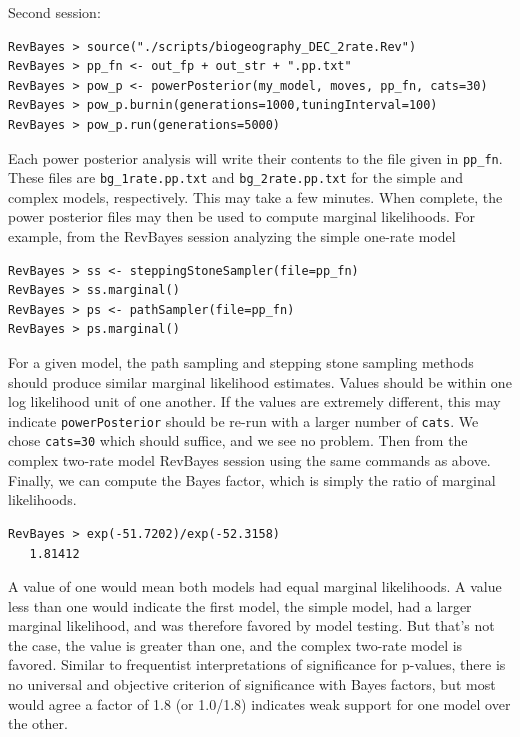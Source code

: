 Second session:
\begin{snugshade}
\begin{lstlisting}
RevBayes > source("./scripts/biogeography_DEC_2rate.Rev")
RevBayes > pp_fn <- out_fp + out_str + ".pp.txt"
RevBayes > pow_p <- powerPosterior(my_model, moves, pp_fn, cats=30) 
RevBayes > pow_p.burnin(generations=1000,tuningInterval=100)
RevBayes > pow_p.run(generations=5000)  
\end{lstlisting}
\end{snugshade}

Each power posterior analysis will write their contents to the file given in {\tt pp\_fn}.
These files are {\tt bg\_1rate.pp.txt} and {\tt bg\_2rate.pp.txt} for the simple and complex models, respectively.
This may take a few minutes.
When complete, the power posterior files may then be used to compute marginal likelihoods.
For example, from the RevBayes session analyzing the simple one-rate model

\begin{snugshade}
\begin{lstlisting}
RevBayes > ss <- steppingStoneSampler(file=pp_fn)
RevBayes > ss.marginal() 
RevBayes > ps <- pathSampler(file=pp_fn)
RevBayes > ps.marginal() 
\end{lstlisting}
\end{snugshade}

For a given model, the path sampling and stepping stone sampling methods should produce similar marginal likelihood estimates.
Values should be within one log likelihood unit of one another.
If the values are extremely different, this may indicate {\tt powerPosterior} should be re-run with a larger number of {\tt cats}.
We chose {\tt cats=30} which should suffice, and we see no problem.
Then from the complex two-rate model RevBayes session using the same commands as above.
Finally, we can compute the Bayes factor, which is simply the ratio of marginal likelihoods.

\begin{snugshade}
\begin{lstlisting}
RevBayes > exp(-51.7202)/exp(-52.3158)
   1.81412
\end{lstlisting}
\end{snugshade}

A value of one would mean both models had equal marginal likelihoods.
A value less than one would indicate the first model, the simple model, had a larger marginal likelihood, and was therefore favored by model testing.
But that's not the case, the value is greater than one, and the complex two-rate model is favored.
Similar to frequentist interpretations of significance for p-values, there is no universal and objective criterion of significance with Bayes factors, but most would agree a factor of 1.8 (or 1.0/1.8) indicates weak support for one model over the other.

